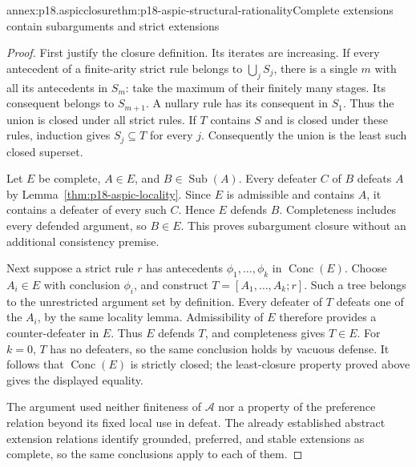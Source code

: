\begin{annexitem}{annex:p18.aspicclosure}{thm:p18-aspic-structural-rationality}{Complete extensions contain subarguments and strict extensions}
\begin{proof}
First justify the closure definition. Its iterates are increasing.
If every antecedent of a finite-arity strict rule belongs to
\(\bigcup_jS_j\), there is a single \(m\) with all its antecedents in
\(S_m\): take the maximum of their finitely many stages. Its consequent
belongs to \(S_{m+1}\). A nullary rule has its consequent in \(S_1\).
Thus the union is closed under all strict rules.
If \(T\) contains \(S\) and is closed under these rules, induction gives
\(S_j\subseteq T\) for every \(j\). Consequently the union is the least
such closed superset.

Let \(E\) be complete, \(A\in E\), and \(B\in\operatorname{Sub}(A)\).
Every defeater \(C\) of \(B\) defeats \(A\) by
Lemma~\ref{thm:p18-aspic-locality}.
Since \(E\) is admissible and contains \(A\), it contains a defeater of
every such \(C\). Hence \(E\) defends \(B\).
Completeness includes every defended argument, so \(B\in E\).
This proves subargument closure without an additional consistency premise.

Next suppose a strict rule \(r\) has antecedents
\(\phi_1,\ldots,\phi_k\) in \(\operatorname{Conc}(E)\).
Choose \(A_i\in E\) with conclusion \(\phi_i\), and construct
\(T=[A_1,\ldots,A_k;r]\). Such a tree belongs to the unrestricted
argument set by definition.
Every defeater of \(T\) defeats one of the \(A_i\), by the same locality
lemma. Admissibility of \(E\) therefore provides a counter-defeater in
\(E\). Thus \(E\) defends \(T\), and completeness gives \(T\in E\).
For \(k=0\), \(T\) has no defeaters, so the same conclusion holds by
vacuous defense. It follows that \(\operatorname{Conc}(E)\) is
strictly closed; the least-closure property proved above gives the
displayed equality.

The argument used neither finiteness of \(\mathcal A\) nor a property of
the preference relation beyond its fixed local use in defeat.
The already established abstract extension relations identify grounded,
preferred, and stable extensions as complete, so the same conclusions
apply to each of them.
\end{proof}
\end{annexitem}

